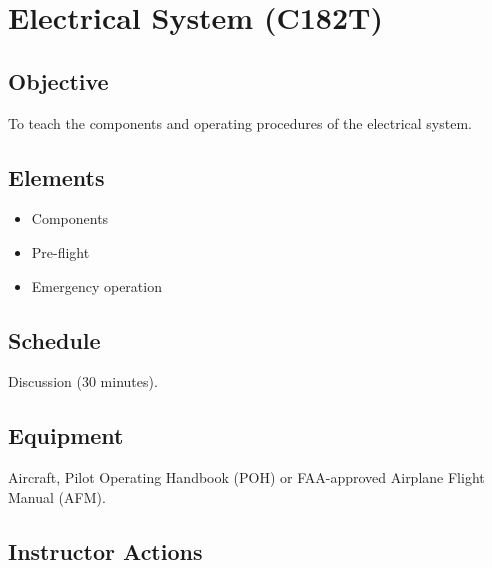 \section{Electrical System (C182T)}

\subsection{Objective}

To teach the components and operating procedures of the electrical system.

\subsection{Elements}

\begin{itemize}
  \item Components
  \item Pre-flight
  \item Emergency operation
\end{itemize}

\subsection{Schedule}

Discussion (30 minutes).

\subsection{Equipment}

Aircraft, Pilot Operating Handbook (POH) or FAA-approved Airplane Flight Manual (AFM).

\subsection{Instructor Actions}

